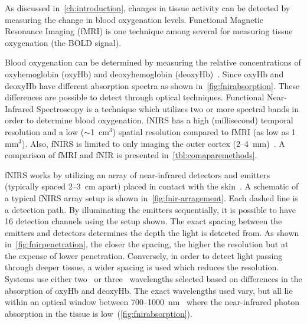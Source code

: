 As discussed in~\cref{ch:introduction}, changes in tissue activity can be detected by measuring the change in blood oxygenation levels.  Functional Magnetic Resonance Imaging (fMRI) is one technique among several for measuring tissue oxygenation (the BOLD signal).

Blood oxygenation can be determined by measuring the relative concentrations of oxyhemoglobin (oxyHb) and deoxyhemoglobin (deoxyHb)~\citep{ogawa1990,kwong1992,fox1986}.  Since oxyHb and deoxyHb have different absorption spectra as shown in~\cref{fig:fnirabsorption}. These differences are possible to detect  through optical techniques.  Functional Near-Infrared Spectroscopy is a technique which utilizes two or more spectral bands in order to determine blood oxygenation.  fNIRS has a high (millisecond) temporal resolution and a low ($\sim$1~cm$^3$) spatial resolution compared to fMRI (as low as 1 mm$^3$). Also, fNIRS is limited to only imaging the outer cortex (2--4~mm)~\citep{bunce2006}. A comparison of fMRI and fNIR is presented in~\cref{tbl:comaparemethods}.

fNIRS works by utilizing an array of near-infrared detectors and emitters (typically spaced 2--3~cm apart) placed in contact with the skin~\citep{villringer1997,izzetoglu2004}.  A schematic of a typical fNIRS array setup is shown in~\cref{fig:fnir-arragement}. Each dashed line is a detection path. By illuminating the emitters sequentially, it is possible to have 16 detection channels using the setup shown.  The exact spacing between the emitters and detectors determines the depth the light is detected from.  As shown in~\cref{fig:fnirpenetration}, the closer the spacing, the higher the resolution but at the expense of lower penetration.  Conversely, in order to detect light passing through deeper tissue, a wider spacing is used which reduces the resolution.  Systems use either two~\citep{villringer1997,izzetoglu2004p,sato2004} or three~\citep{hoshi2003} wavelengths selected based on differences in the absorption of oxyHb and deoxyHb.  The exact wavelengths used vary, but all lie within an optical window between 700--1000~nm~\citep{villringer1997} where the near-infrared photon absorption in the tissue is low~(\cref{fig:fnirabsorption}).

